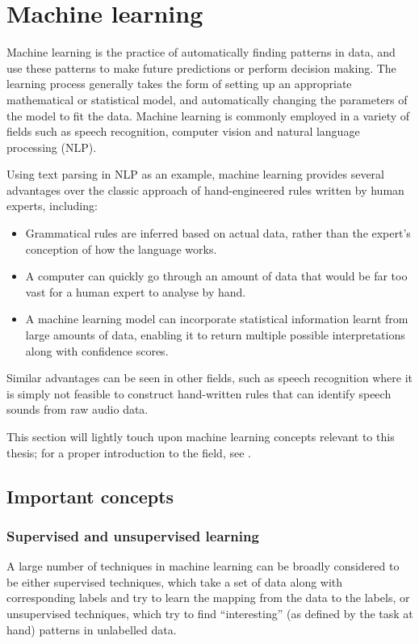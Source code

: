\section{Machine learning}

Machine learning is the practice of automatically finding patterns in data, and use these patterns to make future predictions or perform decision making.
The learning process generally takes the form of setting up an appropriate mathematical or statistical model, and automatically changing the parameters of the model to fit the data.
Machine learning is commonly employed in a variety of fields such as speech recognition, computer vision and natural language processing (NLP).

Using text parsing in NLP as an example, machine learning provides several advantages over the classic approach of hand-engineered rules written by human experts, including:
\begin{itemize}
 \item Grammatical rules are inferred based on actual data, rather than the expert's conception of how the language works.
 \item A computer can quickly go through an amount of data that would be far too vast for a human expert to analyse by hand.
 \item A machine learning model can incorporate statistical information learnt from large amounts of data, enabling it to return multiple possible interpretations along with confidence scores.
\end{itemize}
Similar advantages can be seen in other fields, such as speech recognition where it is simply not feasible to construct hand-written rules that can identify speech sounds from raw audio data.

This section will lightly touch upon machine learning concepts relevant to this thesis; for a proper introduction to the field, see \textcite{murphy2012machine}.

\subsection{Important concepts}
\subsubsection{Supervised and unsupervised learning}

A large number of techniques in machine learning can be broadly considered to be either supervised techniques, which take a set of data along with corresponding labels and try to learn the mapping from the data to the labels, or unsupervised techniques, which try to find ``interesting'' (as defined by the task at hand) patterns in unlabelled data.

